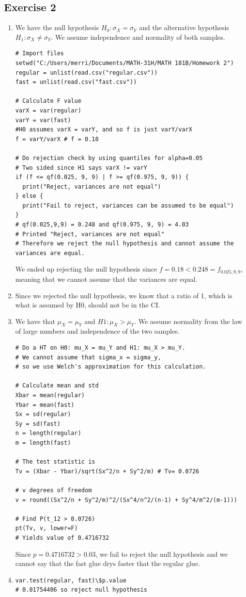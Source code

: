 \documentclass{article}
\begin{document}
\subsection*{Exercise 2}
\begin{enumerate}
	\item We have the null hypothesis $H_0: \sigma_X = \sigma_Y$ and
the alternative hypothesis $H_1: \sigma_X \neq \sigma_Y$.
We assume independence and normality of both samples.
\begin{lstlisting}
# Import files
setwd("C:/Users/merri/Documents/MATH-31H/MATH 181B/Homework 2")
regular = unlist(read.csv("regular.csv"))
fast = unlist(read.csv("fast.csv"))

# Calculate F value
varX = var(regular)
varY = var(fast)
#H0 assumes varX = varY, and so f is just varY/varX
f = varY/varX # f = 0.18

# Do rejection check by using quantiles for alpha=0.05
# Two sided since H1 says varX != varY
if (f <= qf(0.025, 9, 9) | f >= qf(0.975, 9, 9)) {
  print("Reject, variances are not equal")
} else {
  print("Fail to reject, variances can be assumed to be equal")
}
# qf(0.025,9,9) = 0.248 and qf(0.975, 9, 9) = 4.03
# Printed "Reject, variances are not equal"
# Therefore we reject the null hypothesis and cannot assume the variances are equal.
	\end{lstlisting}
	We ended up rejecting the null hypothesis since $f = 0.18 < 0.248 = f_{0.025,9,9}$,
	meaning that we cannot assume that the variances are equal.
	\item Since we rejected the null hypothesis,
	we know that a ratio of 1, which is what is assumed by H0, 
	should not be in the CI.
	\item 
	We have that $\mu_X = \mu_Y$ and $H1: \mu_X > \mu_Y$.
	We assume normality from the law of large numbers and 
	independence of the two samples.
\begin{lstlisting}
# Do a HT on H0: mu_X = mu_Y and H1: mu_X > mu_Y.
# We cannot assume that sigma_x = sigma_y,
# so we use Welch's approximation for this calculation.

# Calculate mean and std
Xbar = mean(regular)
Ybar = mean(fast)
Sx = sd(regular)
Sy = sd(fast)
n = length(regular)
m = length(fast)

# The test statistic is 
Tv = (Xbar - Ybar)/sqrt(Sx^2/n + Sy^2/m) # Tv= 0.0726

# v degrees of freedom
v = round((Sx^2/n + Sy^2/m)^2/(Sx^4/n^2/(n-1) + Sy^4/m^2/(m-1)))

# Find P(t_12 > 0.0726)
pt(Tv, v, lower=F)
# Yields value of 0.4716732
	\end{lstlisting}
	Since $p = 0.4716732 > 0.03$, we fail to reject the null hypothesis and 
	we cannot say that the fast glue drys faster that the regular glue.
	\item \begin{lstlisting}
var.test(regular, fast)\$p.value 
# 0.01754406 so reject null hypothesis


\end{lstlisting}
\end{enumerate}
\end{document}
